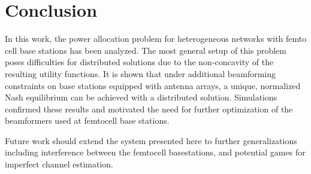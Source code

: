 \chapter{Conclusion}
In this work, the power allocation problem for heterogeneous networks with femto cell base stations has been analyzed. The most general setup of this problem poses difficulties for distributed solutions due to the non-concavity of the resulting utility functions. It is shown that under additional beamforming constraints on base stations equipped with antenna arrays, a unique, normalized Nash equilibrium can be achieved with a distributed solution. Simulations confirmed these results and motivated the need for further optimization of the beamformers used at femtocell base stations.
\par
Future work should extend the system presented here to further generalizations including interference between the femtocell basestations, and potential games for imperfect channel estimation. 